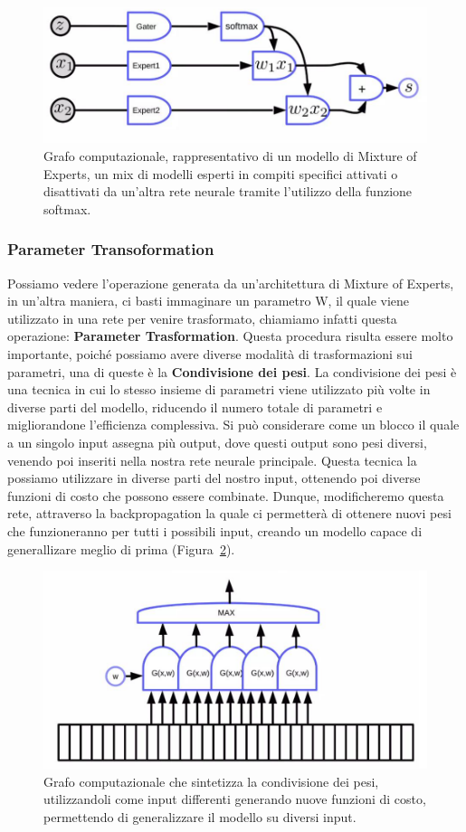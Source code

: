 \begin{figure}
    \centering
    \includegraphics[width=0.50\linewidth]{figure/MixtureOfExpert.png}
    \caption{Grafo computazionale, rappresentativo di un modello di Mixture of Experts, un mix di modelli esperti in compiti specifici attivati o disattivati da un'altra rete neurale tramite l'utilizzo della funzione softmax.}
    \label{fig:mixExp}
\end{figure}

\subsubsection{Parameter Transoformation}
Possiamo vedere l'operazione generata da un'architettura di Mixture of Experts, in un'altra maniera, ci basti immaginare un parametro W, il quale viene utilizzato in una rete per venire trasformato, chiamiamo infatti questa operazione: \textbf{Parameter Trasformation}. Questa procedura risulta essere molto importante, poiché possiamo avere diverse modalità di trasformazioni sui parametri, una di queste è la \textbf{Condivisione dei pesi}. La condivisione dei pesi è una tecnica in cui lo stesso insieme di parametri viene utilizzato più volte in diverse parti del modello, riducendo il numero totale di parametri e migliorandone l'efficienza complessiva. Si può considerare come un blocco il quale a un singolo input assegna più output, dove questi output sono pesi diversi, venendo poi inseriti nella nostra rete neurale principale. Questa tecnica la possiamo utilizzare in diverse parti del nostro input, ottenendo poi diverse funzioni di costo che possono essere combinate. Dunque, modificheremo questa rete, attraverso la backpropagation la quale ci permetterà di ottenere nuovi pesi che funzioneranno per tutti i possibili input, creando un modello capace di generallizare meglio di prima (Figura~\ref{fig:wshar}).

\begin{figure}
    \centering
    \includegraphics[width=0.50\linewidth]{figure/WeightShar.png}
    \caption{Grafo computazionale che sintetizza la condivisione dei pesi, utilizzandoli come input differenti generando nuove funzioni di costo, permettendo di generalizzare il modello su diversi input.}
    \label{fig:wshar}
\end{figure}